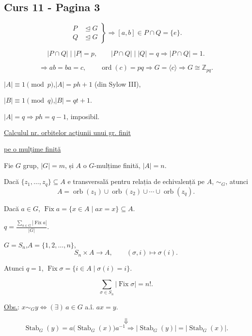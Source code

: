 
\subsection*{Curs 11 - Pagina 3}

\[
\left.\begin{aligned}
P &\trianglelefteq G\\
Q &\trianglelefteq G
\end{aligned}\right\}
\Longrightarrow [a,b]\in P\cap Q=\{e\}.
\]

\[
|P\cap Q|\mid |P|=p,\qquad
|P\cap Q|\mid |Q|=q
\Longrightarrow |P\cap Q|=1.
\]

\[
\Longrightarrow ab=ba=c,\qquad
\operatorname{ord}(c)=pq
\Longrightarrow G=\langle c\rangle
\Longrightarrow G\cong\mathbb{Z}_{pq}.
\]

\bigskip
\noindent $|A|\equiv1\pmod p$,\qquad $|A|=ph+1$ \quad (din Sylow III),

\noindent $|B|\equiv1\pmod q$,\qquad $|B|=qt+1$.

\medskip
\noindent $|A|=q\Longrightarrow ph=q-1$, imposibil.

\bigskip
\noindent\underline{Calculul nr. orbitelor acțiunii unui gr. finit}

\noindent\underline{pe o mulțime finită}

\medskip
\noindent Fie $G$ grup, $|G|=m$, și $A$ o $G$-mulțime finită, $|A|=n$.

\medskip
\noindent Dacă $\{z_1,\ldots,z_q\}\subseteq A$ e transversală pentru relația
 de echivalență pe $A$, $\sim_G$, atunci
\[
A=\operatorname{orb}(z_1)\cup\operatorname{orb}(z_2)
\cup\cdots\cup\operatorname{orb}(z_q).
\]

\noindent Dacă $a\in G$, $\operatorname{Fix}a=\{x\in A\mid ax=x\}\subseteq A$.

\medskip
\noindent{}
\qquad
\(\displaystyle q=\frac{\sum_{a\in G}|\operatorname{Fix}a|}{|G|}.\)

\bigskip
\noindent $G=S_n$,\qquad $A=\{1,2,\ldots,n\}$,
\[
S_n\times A\longrightarrow A,\qquad (\sigma,i)\longmapsto\sigma(i).
\]

\noindent Atunci $q=1$,\quad
$\operatorname{Fix}\sigma=\{i\in A\mid\sigma(i)=i\}$.

\[
\sum_{\sigma\in S_n}|\operatorname{Fix}\sigma|=n!.
\]

\bigskip
\noindent\underline{Obs.}: $x\sim_G y\Longleftrightarrow
(\exists)\,a\in G$ a.î. $ax=y$.

\[
\Downarrow
\]
\[
\operatorname{Stab}_G(y)=a\bigl(\operatorname{Stab}_G(x)\bigr)a^{-1}
\Longrightarrow
|\operatorname{Stab}_G(y)|=|\operatorname{Stab}_G(x)|.
\]
